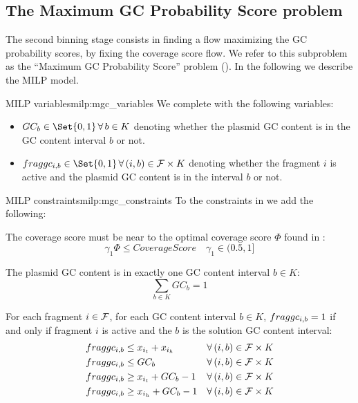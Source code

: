 \subsection{The Maximum GC Probability Score problem \MGC{}}\label{sec:method:mgc}

The second binning stage consists in finding a flow maximizing the GC probability scores, by fixing the coverage score flow.
We refer to this subproblem as the \enquote{Maximum GC Probability Score} problem (\MGC{}).
In the following we describe the MILP model.

\begin{definition}{\MGC{} MILP variables}{milp:mgc_variables}
  We complete  with the following variables:
  \begin{itemize}
    \item \(GC_b \in \Set{0, 1} \, \forall b \in K\) denoting whether the plasmid GC content is in the GC content interval \(b\) or not.
    \item \(\fraggc{i}{b} \in \Set{0, 1} \, \forall (i, b) \in \Fragments{} \times K\) denoting whether the fragment \(i\) is active and the plasmid GC content is in the interval \(b\) or not.
  \end{itemize}
\end{definition}

\begin{definition}{\MGC{} MILP constraints}{milp:mgc_constraints}
  To the constraints in  we add the following:

  \phantom{text}

  The coverage score must be near to the optimal coverage score \(\Phi{}\) found in \MCF{}:
  \begin{equation}
    \gamma_1 \Phi \leq CoverageScore \quad \gamma_1 \in (0.5, 1]
  \end{equation}

  The plasmid GC content is in exactly one GC content interval \(b \in K\):
  \begin{equation}
    \sum_{b \in K} GC_b = 1
  \end{equation}

  For each fragment \(i \in \mathcal{F}{}\), for each GC content interval \(b \in K\), \(fraggc_{i,b} = 1\) if and only if fragment \(i\) is active and the \(b\) is the solution GC content interval:
  \begin{align}
    \fraggc{i}{b} & \leq x_{i_t} + x_{i_h} & \forall (i, b) \in \Fragments{} \times K \\
    \fraggc{i}{b} & \leq GC_b & \forall (i, b) \in \Fragments{} \times K \\
    \fraggc{i}{b} & \geq x_{i_t} + GC_b - 1 & \forall (i, b) \in \Fragments{} \times K \\
    \fraggc{i}{b} & \geq x_{i_h} + GC_b - 1 & \forall (i, b) \in \Fragments{} \times K
  \end{align}
\end{definition}

